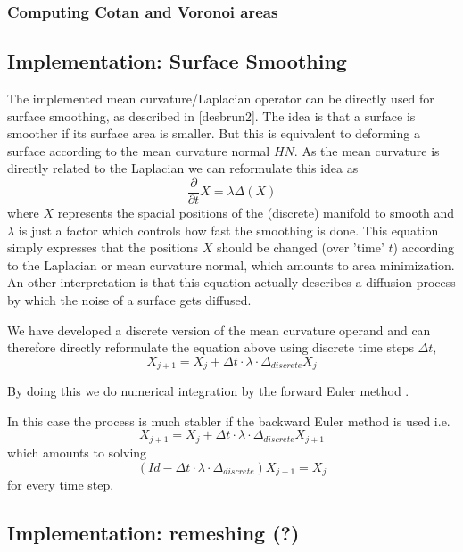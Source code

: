 
\subsubsection*{Computing Cotan and Voronoi areas}

\subsection{Implementation: Surface Smoothing}
The implemented mean curvature/Laplacian operator can be directly used for surface smoothing, as described in [desbrun2]. The idea is that a surface is smoother if its surface area is smaller. But this is equivalent to deforming a surface according to the mean curvature normal $HN$. As the mean curvature is directly related to the Laplacian we can reformulate this idea as 
\[\frac{\partial}{\partial t} X = \lambda \Delta (X)\]
where $X$ represents the spacial positions of the (discrete) manifold to smooth and $\lambda$ is just a factor which controls how fast the smoothing is done. This equation simply expresses that the positions $X$ should be changed (over 'time' $t$) according to the Laplacian or mean curvature normal, which amounts to area minimization. 
An other interpretation is that this equation actually describes a diffusion process by which the noise of a surface gets diffused.

We have developed a discrete version of the mean curvature operand and can therefore directly reformulate the equation above using discrete time steps $\Delta t$,
\[X_{j+1} = X_{j} + \Delta t \cdot \lambda\cdot\Delta_{discrete} X_j\]

By doing this we do numerical integration by the forward Euler method . 

In this case the process is much stabler if the backward Euler method is used i.e.
\[X_{j+1} = X_{j} + \Delta t \cdot \lambda\cdot\Delta_{discrete} X_{j+1}\]
which amounts to solving
\[(Id - \Delta t \cdot \lambda\cdot\Delta_{discrete}) X_{j+1} = X_{j}\]
for every time step. 


\subsection{Implementation: remeshing (?)}
